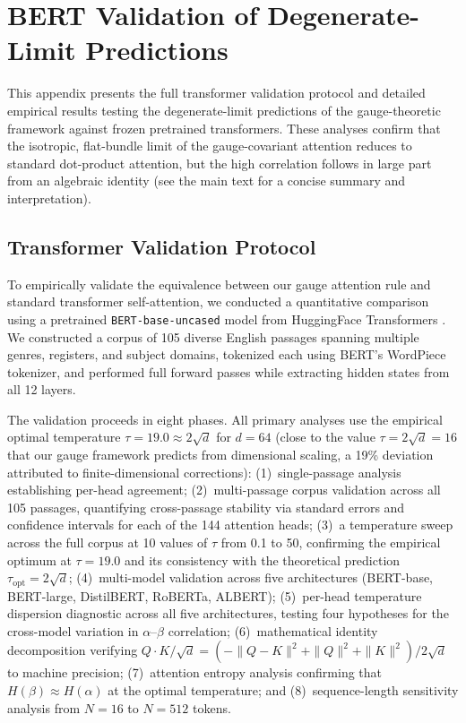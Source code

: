 \documentclass[twoside,11pt]{article}
\begin{document}
\section{BERT Validation of Degenerate-Limit Predictions}
\label{app:bert_validation}

This appendix presents the full transformer validation protocol and detailed empirical results testing the degenerate-limit predictions of the gauge-theoretic framework against frozen pretrained transformers. These analyses confirm that the isotropic, flat-bundle limit of the gauge-covariant attention reduces to standard dot-product attention, but the high correlation follows in large part from an algebraic identity (see the main text for a concise summary and interpretation).

\subsection{Transformer Validation Protocol}
To empirically validate the equivalence between our gauge attention rule and standard transformer self-attention, we conducted a quantitative comparison using a pretrained \texttt{BERT-base-uncased} model from HuggingFace Transformers \citep{devlin2018bert}. We constructed a corpus of 105 diverse English passages spanning multiple genres, registers, and subject domains, tokenized each using BERT's WordPiece tokenizer, and performed full forward passes while extracting hidden states from all 12 layers.

The validation proceeds in eight phases. All primary analyses use the empirical optimal temperature $\tau = 19.0 \approx 2\sqrt{d}$ for $d = 64$ (close to the value $\tau = 2\sqrt{d} = 16$ that our gauge framework predicts from dimensional scaling, a 19\% deviation attributed to finite-dimensional corrections): (1)~single-passage analysis establishing per-head agreement; (2)~multi-passage corpus validation across all 105 passages, quantifying cross-passage stability via standard errors and confidence intervals for each of the 144 attention heads; (3)~a temperature sweep across the full corpus at 10 values of $\tau$ from 0.1 to 50, confirming the empirical optimum at $\tau = 19.0$ and its consistency with the theoretical prediction $\tau_{\text{opt}} = 2\sqrt{d}$; (4)~multi-model validation across five architectures (BERT-base, BERT-large, DistilBERT, RoBERTa, ALBERT); (5)~per-head temperature dispersion diagnostic across all five architectures, testing four hypotheses for the cross-model variation in $\alpha$--$\beta$ correlation; (6)~mathematical identity decomposition verifying $Q \cdot K / \sqrt{d} = (-\|Q-K\|^2 + \|Q\|^2 + \|K\|^2)/2\sqrt{d}$ to machine precision; (7)~attention entropy analysis confirming that $H(\beta) \approx H(\alpha)$ at the optimal temperature; and (8)~sequence-length sensitivity analysis from $N = 16$ to $N = 512$ tokens.
\end{document}
